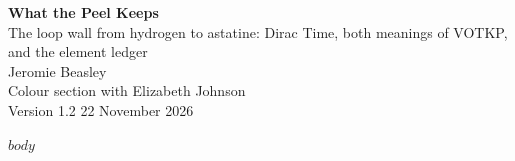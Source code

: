 \documentclass[11pt]{article}
\begin{document}
\begin{center}{\LARGE\bfseries What the Peel Keeps}\\[4pt]{\large The loop wall from hydrogen to astatine: Dirac Time, both meanings of VOTKP, and the element ledger}\\[10pt]{\large Jeromie Beasley}\\[2pt]{\small Colour section with Elizabeth Johnson}\\[2pt]{\small Version 1.2 \textperiodcentered{} 22 November 2026}\end{center}\vspace{6pt}
$body$
\end{document}
